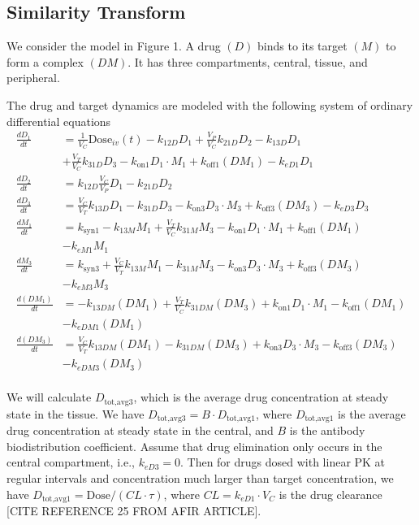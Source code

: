 
\subsection{Similarity Transform} \label{sim trans}

We consider the model in Figure 1. A drug $(D)$ binds to its target $(M)$ to form a complex $(DM)$. It has three compartments, central, tissue, and peripheral.

The drug and target dynamics are modeled with the following system of ordinary differential equations
\begin{align}
\frac{dD_1}{dt} &= \frac{1}{V_C}\text{Dose}_{iv}(t) - k_{12D}D_1 + \frac{V_P}{V_C}k_{21D}D_2 - k_{13D}D_1 \nonumber \\
&+ \frac{V_T}{V_C}k_{31D}D_3 - k_{\text{on}1}D_1 \cdot M_1 + k_{\text{off}1}(DM_1) - k_{eD1}D_1 \\
\frac{dD_2}{dt} &= k_{12D}\frac{V_C}{V_P}D_1 - k_{21D}D_2 \\
\frac{dD_3}{dt} &= \frac{V_C}{V_T}k_{13D}D_1 - k_{31D}D_3 - k_{\text{on}3}D_3 \cdot M_3 + k_{\text{off}3}(DM_3) - k_{eD3}D_3 \\
\frac{dM_1}{dt} &= k_{\text{syn}1} - k_{13M}M_1 + \frac{V_T}{V_C}k_{31M}M_3 - k_{\text{on}1}D_1 \cdot M_1 + k_{\text{off}1}(DM_1) \nonumber \\ 
&- k_{eM1}M_1 \\
\frac{dM_3}{dt} &= k_{\text{syn}3} + \frac{V_C}{V_T}k_{13M}M_1 - k_{31M}M_3 - k_{\text{on}3}D_3 \cdot M_3 + k_{\text{off}3}(DM_3) \nonumber \\ 
&- k_{eM3}M_3 \\
\frac{d(DM_1)}{dt} &= - k_{13DM}(DM_1) + \frac{V_T}{V_C}k_{31DM}(DM_3) + k_{\text{on}1}D_1 \cdot M_1 - k_{\text{off}1}(DM_1) \nonumber \\ 
&- k_{eDM1}(DM_1) \\
\frac{d(DM_3)}{dt} &= \frac{V_C}{V_T}k_{13DM}(DM_1) - k_{31DM}(DM_3) + k_{\text{on}3}D_3 \cdot M_3 - k_{\text{off}3}(DM_3) \nonumber \\ 
&- k_{eDM3}(DM_3) \\
\end{align}

We will calculate $D_{\text{tot,avg}3}$, which is the average drug concentration at steady state in the tissue. We have $D_{\text{tot,avg}3} = B \cdot D_{\text{tot,avg}1}$, where $D_{\text{tot,avg}1}$ is the average drug concentration at steady state in the central, and $B$ is the antibody biodistribution coefficient. Assume that drug elimination only occurs in the central compartment, i.e., $k_{eD3} = 0$. Then for drugs dosed with linear PK at regular intervals and concentration much larger than target concentration, we have $D_{\text{tot,avg}1} = \text{Dose}/(CL \cdot \tau)$, where $CL = k_{eD1} \cdot V_C$ is the drug clearance [CITE REFERENCE 25 FROM AFIR ARTICLE]. \\


